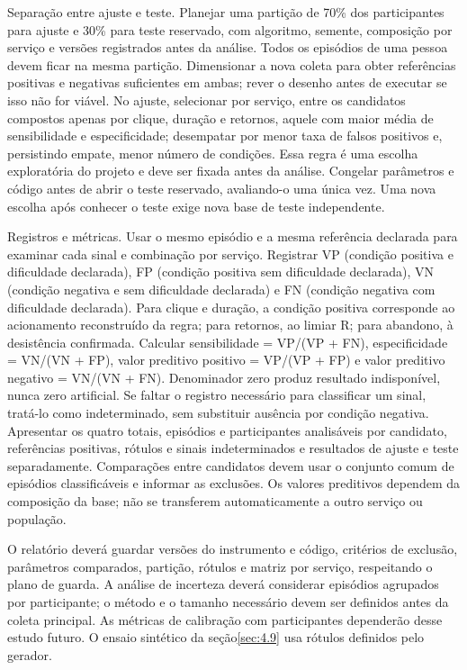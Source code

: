 \begin{apendicesenv}
Separação entre ajuste e teste. Planejar uma partição de 70\% dos participantes para ajuste e 30\% para teste reservado, com algoritmo, semente, composição por serviço e versões registrados antes da análise. Todos os episódios de uma pessoa devem ficar na mesma partição. Dimensionar a nova coleta para obter referências positivas e negativas suficientes em ambas; rever o desenho antes de executar se isso não for viável. No ajuste, selecionar por serviço, entre os candidatos compostos apenas por clique, duração e retornos, aquele com maior média de sensibilidade e especificidade; desempatar por menor taxa de falsos positivos e, persistindo empate, menor número de condições. Essa regra é uma escolha exploratória do projeto e deve ser fixada antes da análise. Congelar parâmetros e código antes de abrir o teste reservado, avaliando-o uma única vez. Uma nova escolha após conhecer o teste exige nova base de teste independente.

Registros e métricas. Usar o mesmo episódio e a mesma referência declarada para examinar cada sinal e combinação por serviço. Registrar VP (condição positiva e dificuldade declarada), FP (condição positiva sem dificuldade declarada), VN (condição negativa e sem dificuldade declarada) e FN (condição negativa com dificuldade declarada). Para clique e duração, a condição positiva corresponde ao acionamento reconstruído da regra; para retornos, ao limiar R; para abandono, à desistência confirmada. Calcular sensibilidade = VP/(VP + FN), especificidade = VN/(VN + FP), valor preditivo positivo = VP/(VP + FP) e valor preditivo negativo = VN/(VN + FN). Denominador zero produz resultado indisponível, nunca zero artificial. Se faltar o registro necessário para classificar um sinal, tratá-lo como indeterminado, sem substituir ausência por condição negativa. Apresentar os quatro totais, episódios e participantes analisáveis por candidato, referências positivas, rótulos e sinais indeterminados e resultados de ajuste e teste separadamente. Comparações entre candidatos devem usar o conjunto comum de episódios classificáveis e informar as exclusões. Os valores preditivos dependem da composição da base; não se transferem automaticamente a outro serviço ou população.

O relatório deverá guardar versões do instrumento e código, critérios de exclusão, parâmetros comparados, partição, rótulos e matriz por serviço, respeitando o plano de guarda. A análise de incerteza deverá considerar episódios agrupados por participante; o método e o tamanho necessário devem ser definidos antes da coleta principal. As métricas de calibração com participantes dependerão desse estudo futuro. O ensaio sintético da seção\nobreakspace{}\ref{sec:4.9} usa rótulos definidos pelo gerador.


\end{apendicesenv}
